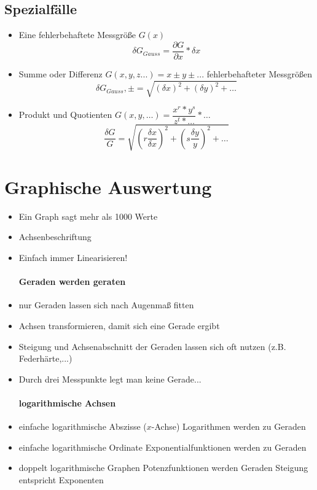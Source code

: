 \documentclass{article}
\begin{document}
	\subsection{Spezialfälle}
	\begin{itemize}
		\item Eine fehlerbehaftete Messgröße $G(x)$ \[\delta G_{Gauss} = \dfrac{\partial G}{\partial x}\ast \delta x\]
		\item Summe oder Differenz $G(x,y,z...)=x\pm y\pm...$ fehlerbehafteter Messgrößen \[\delta G_{Gauss},\pm =\sqrt{(\delta x)^2+(\delta y)^2+\dots}\]
		\item Produkt und Quotienten $G(x,y,\dots)=\dfrac{x^r\ast y^s}{z^t\ast \dots}\ast \dots$ \[\dfrac{\delta G}{G}=\sqrt{\left(r\frac{\delta x}{\delta x}\right)^2+\left(s\frac{\delta y}{y}\right)^2+\dots}\]
	\end{itemize}
	\section{Graphische Auswertung}
	\begin{itemize}
		\item Ein Graph sagt mehr als 1000 Werte
		\item Achsenbeschriftung
		\item Einfach immer Linearisieren!
	\paragraph{\glqq Geraden werden geraten\grqq}
		\item nur Geraden lassen sich nach Augenmaß fitten
		\item Achsen transformieren, damit sich eine Gerade ergibt
		\item Steigung und Achsenabschnitt der Geraden lassen sich oft nutzen (z.B. Federhärte,...)
		\item Durch drei Messpunkte legt man keine Gerade...
	\paragraph{logarithmische Achsen}
		\item einfache logarithmische Abszisse ($x$-Achse)
		\subitem Logarithmen werden zu Geraden
		\item einfache logarithmische Ordinate
		\subitem Exponentialfunktionen werden zu Geraden
		\item doppelt logarithmische Graphen
		\subitem Potenzfunktionen werden Geraden
		\subitem Steigung entspricht Exponenten
	\end{itemize}
\end{document}
